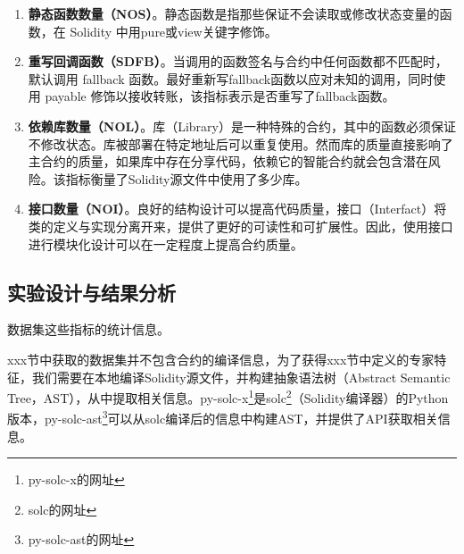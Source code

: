 \begin{enumerate}[label=\Alph*., align=left, leftmargin=*]
    \item \textbf{静态函数数量（NOS）}。静态函数是指那些保证不会读取或修改状态变量的函数，在 Solidity 中用pure或view关键字修饰。
    \item \textbf{重写回调函数（SDFB）}。当调用的函数签名与合约中任何函数都不匹配时，默认调用 fallback 函数。最好重新写fallback函数以应对未知的调用，同时使用 payable 修饰以接收转账，该指标表示是否重写了fallback函数。
    \item \textbf{依赖库数量（NOL）}。库（Library）是一种特殊的合约，其中的函数必须保证不修改状态。库被部署在特定地址后可以重复使用。然而库的质量直接影响了主合约的质量，如果库中存在分享代码，依赖它的智能合约就会包含潜在风险。该指标衡量了Solidity源文件中使用了多少库。
    \item \textbf{接口数量（NOI）}。良好的结构设计可以提高代码质量，接口（Interfact）将类的定义与实现分离开来，提供了更好的可读性和可扩展性。因此，使用接口进行模块化设计可以在一定程度上提高合约质量。
\end{enumerate}
\subsection{实验设计与结果分析}
数据集这些指标的统计信息。

xxx节中获取的数据集并不包含合约的编译信息，为了获得xxx节中定义的专家特征，我们需要在本地编译Solidity源文件，并构建抽象语法树（Abstract Semantic Tree，AST），从中提取相关信息。py-solc-x\footnote{py-solc-x的网址}是solc\footnote{solc的网址}（Solidity编译器）的Python版本，py-solc-ast\footnote{py-solc-ast的网址}可以从solc编译后的信息中构建AST，并提供了API获取相关信息。

